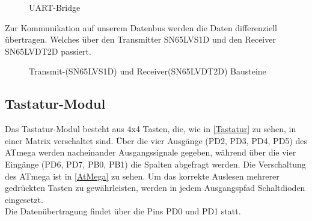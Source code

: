\begin{figure}[H]
    \centering    
    \caption{UART-Bridge}
    \label{USB}
\end{figure}

Zur Kommunikation auf unserem Datenbus werden die Daten differenziell übertragen. Welches über den Transmitter SN65LVS1D und den Receiver SN65LVDT2D passiert.

\begin{figure}[H]
    \centering    
    \caption{Transmit-(SN65LVS1D) und Receiver(SN65LVDT2D) Bausteine }
    \label{T_R_Bausteine}
\end{figure}

\subsection{Tastatur-Modul}
Das Tastatur-Modul besteht aus 4x4 Tasten, die, wie in \ref{Tastatur} zu sehen, in einer Matrix verschaltet sind. Über die vier Ausgänge (PD2, PD3, PD4, PD5) des  ATmega werden nacheinander 
Ausgangssignale gegeben, während über die vier Eingänge (PD6, PD7, PB0, PB1) die Spalten abgefragt werden. Die Verschaltung des ATmega ist in \ref{AtMega} zu sehen. Um das korrekte Auslesen mehrerer gedrückten Tasten zu gewährleisten, werden in jedem 
Ausgangspfad Schaltdioden eingesetzt. \\
Die Datenübertragung findet über die Pins PD0 und PD1 statt.


